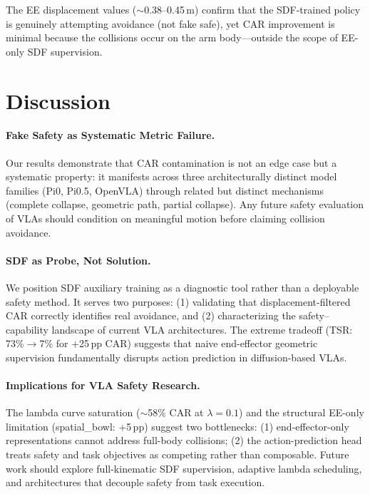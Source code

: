 \documentclass[10pt,twocolumn]{article}
\begin{document}
The EE displacement values ($\sim$0.38--0.45\,m) confirm that the SDF-trained policy is genuinely attempting avoidance (not fake safe), yet CAR improvement is minimal because the collisions occur on the arm body---outside the scope of EE-only SDF supervision.

\section{Discussion}

\paragraph{Fake Safety as Systematic Metric Failure.}
Our results demonstrate that CAR contamination is not an edge case but a systematic property: it manifests across three architecturally distinct model families (Pi0, Pi0.5, OpenVLA) through related but distinct mechanisms (complete collapse, geometric path, partial collapse). Any future safety evaluation of VLAs should condition on meaningful motion before claiming collision avoidance.

\paragraph{SDF as Probe, Not Solution.}
We position SDF auxiliary training as a diagnostic tool rather than a deployable safety method. It serves two purposes: (1) validating that displacement-filtered CAR correctly identifies real avoidance, and (2) characterizing the safety--capability landscape of current VLA architectures. The extreme tradeoff (TSR: 73\%$\to$7\% for +25\,pp CAR) suggests that naive end-effector geometric supervision fundamentally disrupts action prediction in diffusion-based VLAs.

\paragraph{Implications for VLA Safety Research.}
The lambda curve saturation ($\sim$58\% CAR at $\lambda=0.1$) and the structural EE-only limitation (spatial\_bowl: +5\,pp) suggest two bottlenecks: (1) end-effector-only representations cannot address full-body collisions; (2) the action-prediction head treats safety and task objectives as competing rather than composable. Future work should explore full-kinematic SDF supervision, adaptive lambda scheduling, and architectures that decouple safety from task execution.
\end{document}
